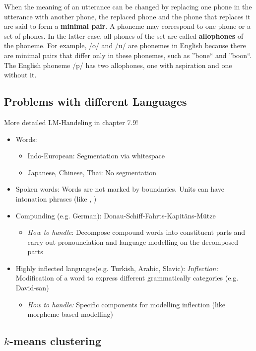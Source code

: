 When the meaning of an utterance can be changed by replacing one phone in the utterance with another phone, the replaced phone and the phone that replaces it are said to form a \textbf{minimal pair}.
A phoneme may correspond to one phone or a set of phones. In the latter case, all phones of the set are called \textbf{allophones} of the phoneme.
For example, /o/ and /u/ are phonemes in English because there are minimal pairs that differ only in these phonemes, such as ''bone`` and ''boon``. The English phoneme /p/ has two allophones, one with aspiration and one without it.

\subsection{Problems with different Languages}
More detailed LM-Handeling in chapter 7.9!
\begin{itemize}
\item{Words:}
\begin{itemize}
\item{Indo-European:} Segmentation via whitespace
\item{Japanese, Chinese, Thai:} No segmentation
\end{itemize}

\item{Spoken words:} Words are not marked by boundaries. Units can have intonation phrases (like , )

\item{Compunding (e.g. German):} Donau-Schiff-Fahrts-Kapitäns-Mütze 
\begin{itemize}
\item \emph{How to handle}: Decompose compound words into constituent parts and carry out pronounciation and language modelling on the decomposed parts
\end{itemize}
 
 \item Highly inflected languages(e.g. Turkish, Arabic, Slavic): \emph{Inflection:} Modification of a word to express different grammatically categories (e.g. David-san) 
 \begin{itemize}
 \item \emph{How to handle:} Specific components for modelling inflection (like morpheme based modelling)
 \end{itemize}

\end{itemize}


\subsection{$k$-means clustering}

